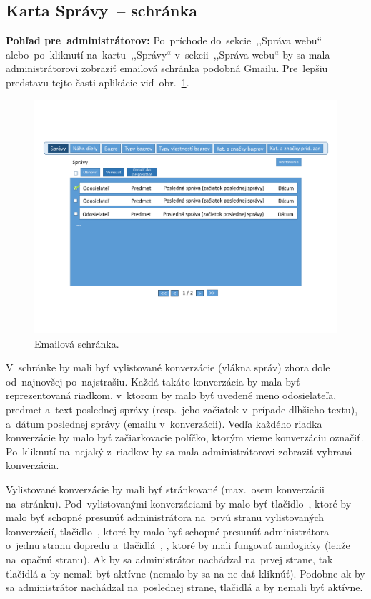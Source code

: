 \subsection{Karta Správy~-- schránka}
\label{karta spravy schranka}

\textbf{Pohľad pre~administrátorov:} Po~príchode do~sekcie~,,Správa webu`` alebo~po~kliknutí na~kartu~,,Správy`` v~sekcii~,,Správa webu`` by sa mala administrátorovi zobraziť emailová schránka podobná Gmailu. Pre~lepšiu predstavu tejto časti aplikácie viď~obr.~\ref{messages}.

\begin{figure}[H]\centering
\includegraphics[width=140mm]{../img/UI concept/messages}
\caption{Emailová schránka.}
\label{messages}
\end{figure}

V~schránke by mali byť vylistované konverzácie (vlákna správ) zhora dole od~najnovšej po~najstrašiu. Každá takáto konverzácia by mala byť reprezentovaná riadkom, v~ktorom by malo byť uvedené meno odosielateľa, predmet a~text poslednej správy (resp.~jeho začiatok v~prípade dlhšieho textu), a~dátum poslednej správy (emailu v~konverzácii). Vedľa každého riadka konverzácie by malo byť začiarkovacie políčko, ktorým vieme konverzáciu označiť. Po~kliknutí na~nejaký z~riadkov by sa mala administrátorovi zobraziť vybraná konverzácia.

Vylistované konverzácie by mali byť stránkované (max.~osem konverzácii na~stránku). Pod~vylistovanými konverzáciami by malo byť tlačidlo~\uv{<<}, ktoré by malo byť schopné presunúť administrátora na~prvú stranu vylistovaných konverzácií, tlačidlo~\uv{<}, ktoré by malo byť schopné presunúť administrátora o~jednu stranu dopredu a~tlačidlá~\uv{>}, \uv{>>}, ktoré by mali fungovať analogicky (lenže na~opačnú stranu). Ak by sa administrátor nachádzal na~prvej strane, tak tlačidlá \uv{<<} a \uv{<} by nemali byť aktívne (nemalo by sa na ne dať kliknúť). Podobne ak by sa administrátor nachádzal na~poslednej strane, tlačidlá \uv{>} a \uv{>>} by nemali byť aktívne.

